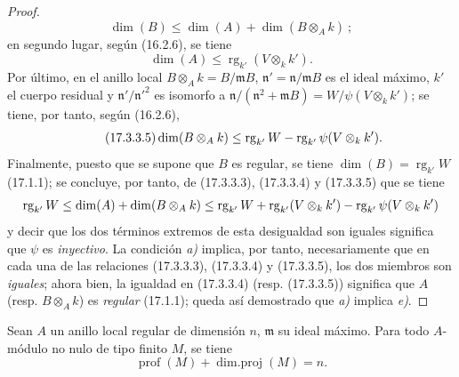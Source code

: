 \begin{proof}
\begin{equation}
\label{0.17.3.3.3-fr}
\tag{17.3.3.3}
  \dim(B)\leq\dim(A)+\dim(B\otimes_A k)~;
\end{equation}
en segundo lugar, según (16.2.6), se tiene
\begin{equation}
\label{0.17.3.3.4-fr}
\tag{17.3.3.4}
  \dim(A)\leq\operatorname{rg}_{k'}(V\otimes_k k').
\end{equation}
Por último, en el anillo local $B\otimes_A k=B/\mathfrak{m}B$,
$\mathfrak{n}'=\mathfrak{n}/\mathfrak{m}B$ es el ideal máximo, $k'$ el cuerpo
residual y $\mathfrak{n}'/\mathfrak{n}'^2$ es isomorfo a
$\mathfrak{n}/(\mathfrak{n}^2+\mathfrak{m}B)
=W/\psi(V\otimes_k k')$; se tiene, por tanto, según (16.2.6),
\begin{equation}
\label{0.17.3.3.5-fr}
\tag{17.3.3.5}
  \dim(B\otimes_A k)
  \leq\operatorname{rg}_{k'}W
  -\operatorname{rg}_{k'}\psi(V\otimes_k k').
\end{equation}
Finalmente, puesto que se supone que $B$ es regular, se tiene
$\dim(B)=\operatorname{rg}_{k'}W$ (17.1.1); se concluye, por tanto, de
(17.3.3.3), (17.3.3.4) y (17.3.3.5) que se tiene
\[
  \operatorname{rg}_{k'}W
  \leq\dim(A)+\dim(B\otimes_A k)
  \leq\operatorname{rg}_{k'}W
  +\operatorname{rg}_{k'}(V\otimes_k k')
  -\operatorname{rg}_{k'}\psi(V\otimes_k k')
\]
y decir que los dos términos extremos de esta desigualdad son iguales
significa que $\psi$ es \emph{inyectivo}. La condición \emph{a)} implica, por tanto,
necesariamente que en cada una de las relaciones (17.3.3.3), (17.3.3.4) y
(17.3.3.5), los dos miembros son \emph{iguales}; ahora bien, la igualdad en
(17.3.3.4) (resp. (17.3.3.5)) significa que $A$ (resp. $B\otimes_A k$) es
\emph{regular} (17.1.1); queda así demostrado que \emph{a)} implica \emph{e)}.
\end{proof}

\begin{proposition}[17.3.4]
\label{0.17.3.4-fr}
Sean $A$ un anillo local regular de dimensión $n$, $\mathfrak{m}$ su ideal
máximo. Para todo $A$-módulo no nulo de tipo finito $M$, se tiene
\begin{equation}
\label{0.17.3.4.1-fr}
\tag{17.3.4.1}
  \operatorname{prof}(M)+\operatorname{dim.proj}(M)=n.
\end{equation}
\end{proposition}

